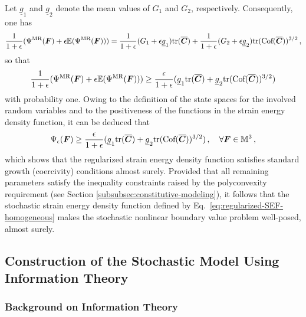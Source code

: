 Let $\underline{g}_1$ and $\underline{g}_2$ denote the mean values of $G_1$ and $G_2$, respectively. Consequently, one has
\begin{equation}
    \frac{1}{1+\epsilon}( \Psi^{\text{MR}}(\boldsymbol{F}) + \epsilon \mathbb{E}(\Psi^{\text{MR}}(\boldsymbol{F}))) = \frac{1}{1+\epsilon}(G_1 + \epsilon \underline{g}_1) \textnormal{tr}(\overline{\boldsymbol{C}}) +  \frac{1}{1+\epsilon}(G_2 + \epsilon \underline{g}_2) \textnormal{tr}(\text{Cof}(\overline{\boldsymbol{C}}))^{3/2}\,,
\end{equation}
so that 
\begin{equation}
    \frac{1}{1+\epsilon}( \Psi^{\text{MR}}(\boldsymbol{F}) + \epsilon \mathbb{E}(\Psi^{\text{MR}}(\boldsymbol{F}))) \geq \frac{\epsilon}{1+\epsilon}(\underline{g}_1 \textnormal{tr}(\overline{\boldsymbol{C}}) + \underline{g}_2 \textnormal{tr}(\text{Cof}(\overline{\boldsymbol{C}}))^{3/2})
\end{equation}
with probability one. Owing to the definition of the state spaces for the involved random variables and to the positiveness of the functions in the strain energy density function, it can be deduced that
\begin{equation}
    \Psi_{\epsilon}(\boldsymbol{F}) \geq \frac{\epsilon}{1+\epsilon}(\underline{g}_1 \textnormal{tr}(\overline{\boldsymbol{C}}) + \underline{g}_2 \textnormal{tr}(\text{Cof}(\overline{\boldsymbol{C}}))^{3/2})\,,\quad \forall \boldsymbol{F} \in \mathbb{M}^3\,,
\end{equation}
which shows that the regularized strain energy density function satisfies standard growth (coercivity) conditions almost surely. Provided that all remaining parameters satisfy the inequality constraints raised by the polyconvexity requirement (see Section \ref{subsubsec:constitutive-modeling}), it follows that the stochastic strain energy density function defined by Eq.~\eqref{eq:regularized-SEF-homogeneous} makes the stochastic nonlinear boundary value problem well-posed, almost surely.

\subsection{Construction of the Stochastic Model Using Information Theory}

\subsubsection{Background on Information Theory}\label{subsubsec:background-inf-theory}

